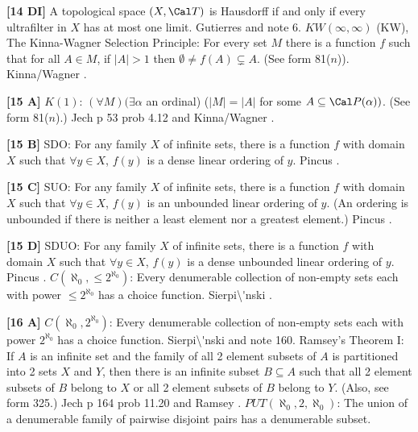 \item{}{\bf [14 DI]} A topological space $(X,\Cal T)$ is Hausdorff if and
only if every ultrafilter in $X$ has at most one limit.  \ac{Gutierres}
\cite{2004} and note 6.
\medskip
{} $KW(\infty,\infty)$ (KW), The Kinna-Wagner Selection
Principle: For every  set $M$ there is a function $f$ such that
for all $A\in M$, if $|A|>1$ then $\emptyset\neq f(A)\subsetneq A$.
(See form 81($n$)).  \ac{Kinna/Wagner} \cite{1955}.
\smallskip
\item{}{\bf [15 A]} $K(1)$: $(\forall M)(\exists\alpha$ an
ordinal) ($|M| = |A|$ for some $A \subseteq {\Cal P}(\alpha))$.
(See form 81($n$).) \ac{Jech} \cite{1973b} p 53 prob  4.12 and
\ac{Kinna/Wagner} \cite{1955}.
\smallskip
\item{}{\bf [15 B]} SDO: For any family $X$ of infinite sets, there is a
function $f$ with domain $X$ such that $\forall y\in X$, $f(y)$ is a dense
linear ordering of $y$.  \ac{Pincus} \cite{1997}.
\smallskip
\item{}{\bf [15 C]} SUO: For any family $X$ of infinite sets, there is a
function $f$ with domain $X$ such that $\forall y\in X$, $f(y)$ is an
unbounded linear ordering of $y$. (An ordering is unbounded if there
is neither a least element nor a greatest element.) \ac{Pincus} \cite{1997}.
\smallskip
\item{}{\bf [15 D]} SDUO: For any family $X$ of infinite sets, there is a
function $f$ with domain $X$ such that $\forall y\in X$, $f(y)$ is
a dense unbounded linear ordering of $y$. \ac{Pincus} \cite{1997}.
\medskip
{}  $C(\aleph_{0},\le 2^{\aleph_{0}})$:  Every denumerable
collection of non-empty sets  each with power $\le  2^{\aleph_{0}}$
has a choice function.  \ac{Sierpi\'nski} \cite{1918}.
\medskip
\item{}{\bf [16 A]} $C(\aleph_0,2^{\aleph_0})$:  Every denumerable
collection of non-empty sets each with power $2^{\aleph_{0}}$ has a choice
function.  \ac{Sierpi\'nski} \cite{1918} and note 160.
\medskip
{} Ramsey's Theorem I: If $A$ is an infinite set and the
family of all 2 element subsets of $A$ is partitioned into 2 sets $X$ and
$Y$, then there is an infinite subset $B\subseteq A$ such that all 2
element subsets of $B$ belong to $X$ or all 2 element subsets of $B$
belong to $Y$. (Also, see form 325.) \ac{Jech} \cite{1973b} p 164 prob
11.20 and \ac{Ramsey} \cite{1929}. 
\medskip
{} $PUT(\aleph_{0},2,\aleph_{0})$:  The union of a
denumerable family of pairwise disjoint pairs has a denumerable subset.
